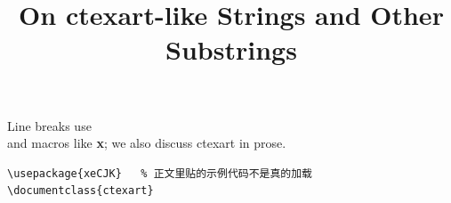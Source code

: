 \documentclass[11pt,twocolumn]{article}
\title{On ctexart-like Strings and Other Substrings}
\newcommand{\note}[1]{\textbf{#1}}
\begin{document}
\maketitle
Line breaks use \\ and macros like \note{x}; we also discuss ctexart in prose.
\begin{verbatim}
\usepackage{xeCJK}   % 正文里贴的示例代码不是真的加载
\documentclass{ctexart}
\end{verbatim}
\end{document}
